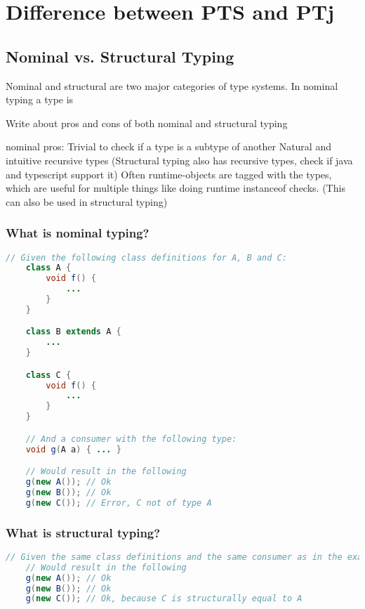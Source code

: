 
\chapter{Difference between PTS and PTj}\label{ch:difference-between-pts-and-ptj}


\section{Nominal vs. Structural Typing}\label{sec:nominal-vs-structural-typing}

Nominal and structural are two major categories of type systems.
In nominal typing a type is

Write about pros and cons of both nominal and structural typing

nominal pros:
Trivial to check if a type is a subtype of another
Natural and intuitive recursive types (Structural typing also has recursive types, check if java and typescript support it)
Often runtime-objects are tagged with the types, which are useful for multiple things like doing runtime instanceof checks. (This can also be used in structural typing)

\subsection{What is nominal typing?}\label{subsec:what-is-nominal-typing?}



\begin{lstlisting}[label={lst:nominal-typing-example}, language=Java]
    // Given the following class definitions for A, B and C:
    class A {
        void f() {
            ...
        }
    }

    class B extends A {
        ...
    }

    class C {
        void f() {
            ...
        }
    }

    // And a consumer with the following type:
    void g(A a) { ... }

    // Would result in the following
    g(new A()); // Ok
    g(new B()); // Ok
    g(new C()); // Error, C not of type A
\end{lstlisting}

\subsection{What is structural typing?}\label{subsec:what-is-structural-typing?}

\begin{lstlisting}[label={lst:structural-typing-example2}, language=Java]
    // Given the same class definitions and the same consumer as in the example above.
    // Would result in the following
    g(new A()); // Ok
    g(new B()); // Ok
    g(new C()); // Ok, because C is structurally equal to A
\end{lstlisting}



